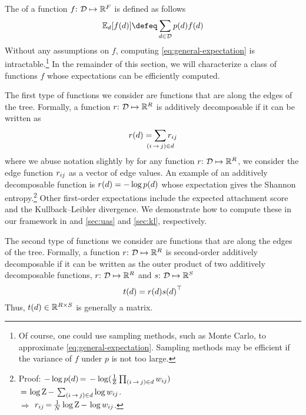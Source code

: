 \documentclass[11pt,a4paper]{article}
\theoremstyle{definition}
\begin{document}
The  of a function $f{:}\,\,{\mathcal{D}} \mapsto \mathbb{R}^{{F}}$ is defined as follows
\begin{equation}
    \expect{\tree}{f(\tree)} \defeq \sumtree\ptree{\tree}\treefunc{f}{\tree}  \label{eq:general-expectation}
\end{equation}
Without any assumptions on $f$, computing \cref{eq:general-expectation} is intractable.\footnote{Of course, one could use sampling methods, such as Monte Carlo, to approximate \cref{eq:general-expectation}.  Sampling methods may be efficient if the variance of $f$ under $p$ is not too large.} 
In the remainder of this section, we will characterize a class of functions $f$ whose expectations can be efficiently computed.

The first type of functions we consider are functions that are 
along the edges of the tree.
Formally, a function $r{:}\,\,{\mathcal{D}} \mapsto \mathbb{R}^{{R}}$ is additively decomposable if it can be written as
\begin{equation}
    \rtree{\tree} = \smashoperator{\sum_{\edgeij\in\tree}}\redge{ij}
\end{equation}
where we abuse notation slightly by for any function $r{:}\,\,{\mathcal{D}} \mapsto \mathbb{R}^{{R}}$, we consider the edge function ${r_{ij}}$ as a vector of edge values.
An example of an additively decomposable function is  ${r({d})} = -\log {p({d})}$ whose expectation gives the Shannon entropy.\footnote{
Proof: $-\log {p({d})} \,{=}\, -\log(\frac{1}{{\mathrm{Z}}} \prod_{{(i\,{\rightarrow}\,j)}\in{d}} {w_{ij}})$\\
$\,{=}\, \log{\mathrm{Z}} \,{-}\, \sum_{{(i\,{\rightarrow}\,j)} \in {d}} \log{w_{ij}}$.\\ $\Rightarrow$ ${r_{ij}} \,{=}\, \frac{1}{{N}}\log{\mathrm{Z}}\,{-}\,\log{w_{ij}}$.}
Other first-order expectations include the expected attachment score and the Kullback--Leibler divergence.
We demonstrate how to compute these in our framework in and \cref{sec:uas} and \cref{sec:kl}, respectively.

The second type of functions we consider are functions that are  along the edges of the tree.
Formally, a function $r{:}\,\,{\mathcal{D}} \mapsto \mathbb{R}^{{R}}$ is second-order additively decomposable if it can be written as the outer product of two additively decomposable functions, $r{:}\,\,{\mathcal{D}} \mapsto \mathbb{R}^{{R}}$ and  $s{:}\,\,{\mathcal{D}} \mapsto \mathbb{R}^{{S}}$
\begin{equation}\label{eq:first-order}
    {t({d})} = {r({d})} {s({d})}^\top
\end{equation}
Thus, ${t({d})} \in \mathbb{R}^{{R} \times {S}}$ is generally a matrix.
\end{document}
